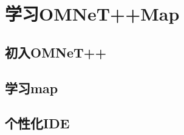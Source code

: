 \chapter{学习OMNeT++Map}

\begin{summary}
  \blindtext
\end{summary}

\section{初入OMNeT++}
\Blindtext

\section{学习map}
\Blindtext

\section{个性化IDE}
\Blindtext


